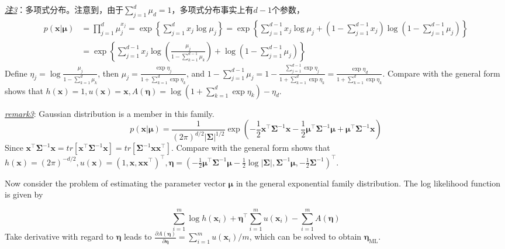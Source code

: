 \documentclass{article}
\begin{document}
\begin{itemize}
\begin{scriptsize}
\begin{spacing}{1.2}
{	\textit{\underline{注3}}：多项式分布。注意到，由于$\sum_{j=1}^d \mu_d = 1$，多项式分布事实上有$d-1$个参数，
	\begin{equation*}
	\begin{split}
	p(\bm{x}|\bm{\mu}) &= \prod_{j=1}^d \mu_j^{x_j} = \exp\left\{ \sum_{j=1}^d x_j \log \mu_j \right\} = \exp\left\{ \sum_{j=1}^{d-1} x_j \log \mu_j + \left(1-\sum_{j=1}^{d-1} x_j \right) \log \left(1-\sum_{j=1}^{d-1} \mu_j \right) \right\} \\
	&= \exp\left\{ \sum_{j=1}^{d-1} x_j \log \left( \frac{\mu_j}{1-\sum_{k=1}^{d-1} \mu_k} \right) +  \log \left(1-\sum_{j=1}^{d-1} \mu_j \right) \right\}
	\end{split}
	\end{equation*}
	Define $\eta_j =  \log \frac{\mu_j}{1-\sum_{k=1}^d \mu_k}$, then $\mu_j = \frac{\exp\eta_j}{1+\sum_{k=1}^d \exp \eta_k}$, and $1-\sum_{j=1}^{d-1} \mu_j = 1-\frac{\sum_{j=1}^{d-1} \exp \eta_j}{1+\sum_{k=1}^d \exp \eta_k}=\frac{\exp \eta_{d}}{1+\sum_{k=1}^d \exp \eta_k}$. Compare with the general form shows that $h(\bm{x})=1, u(\bm{x})=\bm{x}, A(\bm{\eta})=\log (1+\sum_{k=1}^d \exp \eta_k)-\eta_d$.
	
	\textit{\underline{remark3}}: Gaussian distribution is a member in this family.
	\begin{equation*}
	p(\bm{x}|\bm{\mu}) = \frac{1}{(2\pi)^{d/2} |\bm{\Sigma}|^{1/2}} \exp \left( -\frac{1}{2} \bm{x}^\top \bm{\Sigma}^{-1} \bm{x}  -\frac{1}{2} \bm{\mu}^\top \bm{\Sigma}^{-1} \bm{\mu} + \bm{\mu}^\top \bm{\Sigma}^{-1} \bm{x} \right)
	\end{equation*}
	Since $\bm{x}^\top \bm{\Sigma}^{-1} \bm{x} = tr [\bm{x}^\top \bm{\Sigma}^{-1} \bm{x}] = tr [\bm{\Sigma}^{-1} \bm{x} \bm{x}^\top ]$. Compare with the general form shows that $h(\bm{x})=(2\pi)^{-d/2}, u(\bm{x})=(1, \bm{x}, \bm{x}\bm{x}^\top)^\top, \bm{\eta}=(-\frac{1}{2} \bm{\mu}^\top \bm{\Sigma}^{-1} \bm{\mu}-\frac{1}{2}\log|\bm{\Sigma}|, \bm{\Sigma}^{-1}\bm{\mu}, -\frac{1}{2} \bm{\Sigma}^{-1})^\top$.
	}
	\end{spacing}
	\end{scriptsize}
	\vspace{-2mm}	
	Now consider the problem of estimating the parameter vector $\bm{\mu}$ in the general exponential family distribution. The log likelihood function is given by
	
	\begin{equation*}
	\sum_{i=1}^m \log h(\bm{x}_i) + \bm{\eta}^\top \sum_{i=1}^m u(\bm{x}_i) - \sum_{i=1}^m A(\bm{\eta})
	\end{equation*}
Take derivative with regard to $\bm{\eta}$ leads to $\frac{\partial A(\bm{\eta})}{\partial \bm{\eta}} = \sum_{i=1}^m u(\bm{x}_i)/m$, which can be solved to obtain $\bm{\eta}_\mathrm{ML}$.
	

\end{itemize}
\end{document}
